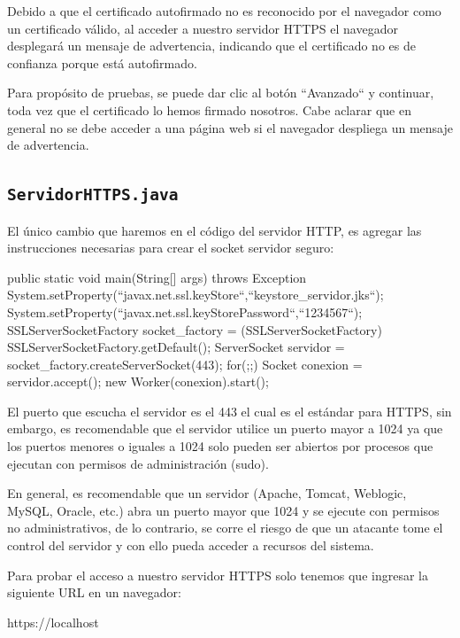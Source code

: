 \documentclass[11pt,a4paper,oneside]{book}
\begin{document}
Debido a que el certificado autofirmado no es reconocido por el navegador como un certificado válido, al acceder a nuestro servidor HTTPS el navegador desplegará un mensaje de advertencia, indicando que el certificado no es de confianza porque está autofirmado.

Para propósito de pruebas, se puede dar clic al botón ``Avanzado`` y continuar, toda vez que el certificado lo hemos firmado nosotros. Cabe aclarar que en general no se debe acceder a una página web si el navegador despliega un mensaje de advertencia.

\subsection{\texttt{ServidorHTTPS.java}}

El único cambio que haremos en el código del servidor HTTP, es agregar las instrucciones necesarias para crear el socket servidor seguro:

\begin{SourceCode}
public static void main(String[] args) throws Exception
{
    System.setProperty(``javax.net.ssl.keyStore``,``keystore_servidor.jks``);
    System.setProperty(``javax.net.ssl.keyStorePassword``,``1234567``);
    SSLServerSocketFactory socket_factory = (SSLServerSocketFactory)
                                            SSLServerSocketFactory.getDefault();
    ServerSocket servidor = socket_factory.createServerSocket(443);
    for(;;)
    {
      Socket conexion = servidor.accept();
      new Worker(conexion).start();
    }
}
\end{SourceCode}

El puerto que escucha el servidor es el 443 el cual es el estándar para HTTPS, sin embargo, es recomendable que el servidor utilice un puerto mayor a 1024 ya que los puertos menores o iguales a 1024 solo pueden ser abiertos por procesos que ejecutan con permisos de administración (sudo).

En general, es recomendable que un servidor (Apache, Tomcat, Weblogic, MySQL, Oracle, etc.) abra un puerto mayor que 1024 y se ejecute con permisos no administrativos, de lo contrario, se corre el riesgo de que un atacante tome el control del servidor y con ello pueda acceder a recursos del sistema.

Para probar el acceso a nuestro servidor HTTPS solo tenemos que ingresar la siguiente URL en un navegador:

\begin{SourceCode}
https://localhost
\end{SourceCode}
\end{document}
